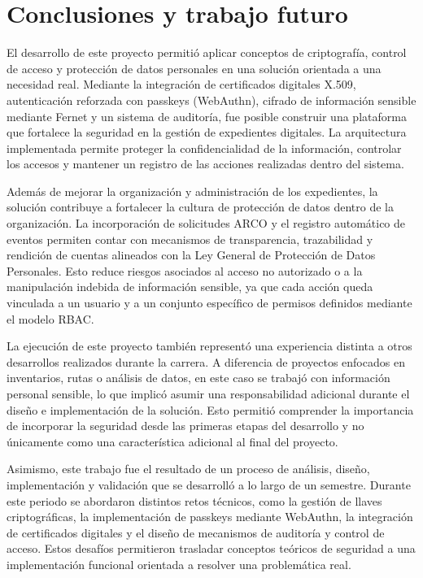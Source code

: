 \documentclass[10pt, letterpaper]{article}
\begin{document}
\newpage

\section{Conclusiones y trabajo futuro}

El desarrollo de este proyecto permitió aplicar conceptos de criptografía, control de acceso y protección de datos personales en una solución orientada a una necesidad real. Mediante la integración de certificados digitales X.509, autenticación reforzada con passkeys (WebAuthn), cifrado de información sensible mediante Fernet y un sistema de auditoría, fue posible construir una plataforma que fortalece la seguridad en la gestión de expedientes digitales. La arquitectura implementada permite proteger la confidencialidad de la información, controlar los accesos y mantener un registro de las acciones realizadas dentro del sistema.

Además de mejorar la organización y administración de los expedientes, la solución contribuye a fortalecer la cultura de protección de datos dentro de la organización. La incorporación de solicitudes ARCO y el registro automático de eventos permiten contar con mecanismos de transparencia, trazabilidad y rendición de cuentas alineados con la Ley General de Protección de Datos Personales. Esto reduce riesgos asociados al acceso no autorizado o a la manipulación indebida de información sensible, ya que cada acción queda vinculada a un usuario y a un conjunto específico de permisos definidos mediante el modelo RBAC.

La ejecución de este proyecto también representó una experiencia distinta a otros desarrollos realizados durante la carrera. A diferencia de proyectos enfocados en inventarios, rutas o análisis de datos, en este caso se trabajó con información personal sensible, lo que implicó asumir una responsabilidad adicional durante el diseño e implementación de la solución. Esto permitió comprender la importancia de incorporar la seguridad desde las primeras etapas del desarrollo y no únicamente como una característica adicional al final del proyecto.

Asimismo, este trabajo fue el resultado de un proceso de análisis, diseño, implementación y validación que se desarrolló a lo largo de un semestre. Durante este periodo se abordaron distintos retos técnicos, como la gestión de llaves criptográficas, la implementación de passkeys mediante WebAuthn, la integración de certificados digitales y el diseño de mecanismos de auditoría y control de acceso. Estos desafíos permitieron trasladar conceptos teóricos de seguridad a una implementación funcional orientada a resolver una problemática real.
\end{document}
